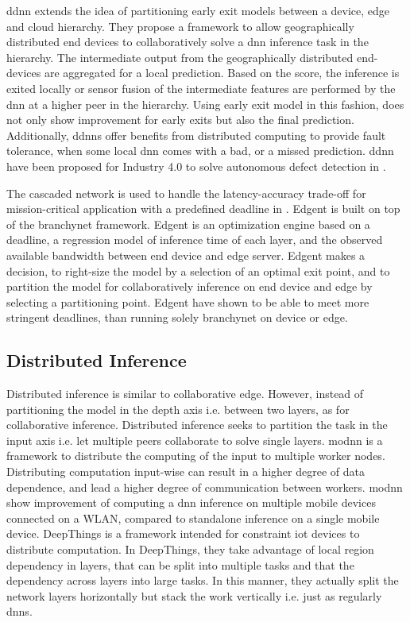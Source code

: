 \begin{enumdescript}
	\gls{ddnn} \cite{teerapittayanon_distributed_2017} extends the idea of partitioning early exit models between a device, edge and cloud hierarchy. They propose a framework to allow geographically distributed end devices to collaboratively solve a \gls{dnn} inference task in the hierarchy. The intermediate output from the geographically distributed end-devices are aggregated for a local prediction. Based on the score, the inference is exited locally or sensor fusion of the intermediate features are performed by the \gls{dnn} at a higher peer in the hierarchy. Using early exit model in this fashion, does not only show improvement for early exits but also the final prediction. Additionally, \gls{ddnn}s offer benefits from distributed computing to provide fault tolerance, when some local \gls{dnn} comes with a bad, or a missed prediction. \gls{ddnn} have been proposed for Industry 4.0 to solve autonomous defect detection in \cite{li_deep_2018}. 
	
	The cascaded network is used to handle the latency-accuracy trade-off for mission-critical application with a predefined deadline in \cite{li_edge_2018}.  Edgent \cite{li_edge_2018} is built on top of the \gls{branchynet} framework. Edgent is an optimization engine based on a deadline, a regression model of inference time of each layer, and the observed available bandwidth between end device and edge server. Edgent makes a decision, to right-size the model by a selection of an optimal exit point, and to partition the model for collaboratively inference on end device and edge by selecting a partitioning point. Edgent have shown to be able to meet more stringent deadlines, than running solely \gls{branchynet} on device or edge.
\end{enumdescript}

\subsection{Distributed Inference}

Distributed inference is similar to collaborative edge. However, instead of partitioning the model in the depth axis i.e. between two layers, as for collaborative inference. Distributed inference seeks to partition the task in the input axis i.e. let multiple peers collaborate to solve single layers. \gls{modnn} \cite{mao_modnn:_2017} is a framework to distribute the computing of the input to multiple worker nodes. Distributing computation input-wise can result in a higher degree of data dependence, and lead a higher degree of communication between workers. \gls{modnn} show improvement of computing a \gls{dnn} inference on multiple mobile devices connected on a WLAN, compared to standalone inference on a single mobile device. DeepThings \cite{zhao_deepthings:_2018} is a framework intended for constraint \gls{iot} devices to distribute computation. In DeepThings, they take advantage of local region dependency in layers, that can be split into multiple tasks and that the dependency across layers into large tasks. In this manner, they actually split the network layers horizontally but stack the work vertically i.e. just as regularly \gls{dnn}s.